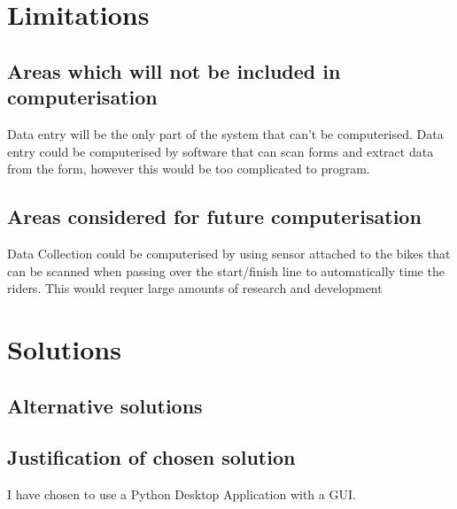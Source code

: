 \section{Limitations}

\subsection{Areas which will not be included in computerisation}
Data entry will be the only part of the system that can't be computerised. Data entry could be computerised by software that can scan forms and extract data from the form, however this would be too complicated to program.
\subsection{Areas considered for future computerisation}
Data Collection could be computerised by using sensor attached to the bikes that can be scanned when passing over the start/finish line to automatically time the riders. This would requer large amounts of research and development
\section{Solutions}

\subsection{Alternative solutions}

\subsection{Justification of chosen solution}
I have chosen to use a Python Desktop Application with a GUI.

